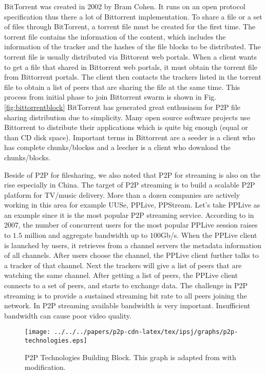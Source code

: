 BitTorrent was created in 2002 by Bram Cohen. 
It runs on an open protocol specification thus there a lot of Bittorrent implementation.
To share a file or a set of files through BitTorrent, a torrent file must be created for the first time.  
The torrent file contains the information of the content, which includes the information of the tracker and the hashes of the file blocks to be distributed.
The torrent file is usually distributed via Bittorent web portals.
When a client wants to get a file that shared in Bittorrent web portals, it must obtain the torrent file from Bittorrent portals.
The client then contacts the trackers listed in the torrent file to obtain a list of peers that are sharing the file at the same time.  
This process from initial phase to join Bittorrent swarm is shown in Fig.\ref{fig:bittorrentblock}
BitTorrent has generated great enthusiasm for P2P file sharing distribution due to simplicity.  
Many open source software projects use Bittorrent to distribute their applications which is quite big enough (equal or than CD disk space).
Important terms in Bittorrent are a seeder is a client who has complete chunks/blockss and a leecher is a client who download the chunks/blocks.

Beside of P2P for filesharing, we also noted that P2P for streaming is also on the rise especially in China.
The target of P2P streaming is to build a scalable P2P platform for TV/music delivery. 
More than a dozen companies are actively working in this area for example UUSe, PPLive, PPStream.  
Let's take PPLive as an example since it is the most popular P2P streaming service.
According to \cite{4378423} in 2007, the number of concurrent users for the most popular PPLive session raises to $1.5$ million and aggregate bandwidth up to $100$Gb/s.
When the PPLive client is launched by users, it retrieves from a channel servers the metadata information of all channels. 
After users choose the channel, the PPLive client further talks to a tracker of that channel. 
Next the trackers will give  a list of peers that are watching the same channel. 
After getting a list of peers, the PPLive client connects to a set of peers, and starts to exchange data. 
The challenge in P2P streaming is to provide a sustained streaming bit rate to all peers joining the network. 
In P2P streaming available bandwidth is very important.  
Insufficient bandwidth can cause poor video quality.  

\begin{figure}[tb]
\begin{center}
\texttt{[image: ../../../papers/p2p-cdn-latex/tex/ipsj/graphs/p2p-technologies.eps]}
\end{center}
\caption{P2P Technologies Building Block. This graph is adapted from \cite{Passarella20121} with modification.} 
\label{fig:p2ptech}
\end{figure}

